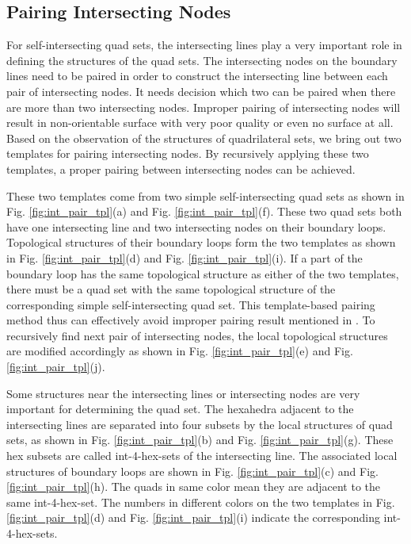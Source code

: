 \documentclass[final,5p,times,twocolumn]{elsarticle}
\begin{document}
\subsection{Pairing Intersecting Nodes}
\label{sec:int_pt_pair}
For self-intersecting quad sets, the intersecting lines play a very important role in defining the structures of the quad sets. The intersecting nodes on the boundary lines need to be paired in order to construct the intersecting line between each pair of intersecting nodes. It needs decision which two can be paired when there are more than two intersecting nodes. Improper pairing of intersecting nodes will result in non-orientable surface with very poor quality or even no surface at all\cite{Suzuki:2010hn}. Based on the observation of the structures of quadrilateral sets, we bring out two templates for pairing intersecting nodes. By recursively applying these two templates, a proper pairing between intersecting nodes can be achieved. 

These two templates come from two simple self-intersecting quad sets as shown in Fig. \ref{fig:int_pair_tpl}(a) and Fig. \ref{fig:int_pair_tpl}(f). These two quad sets both have one intersecting line and two intersecting nodes on their boundary loops. Topological structures of their boundary loops form the two templates as shown in Fig. \ref{fig:int_pair_tpl}(d) and Fig. \ref{fig:int_pair_tpl}(i). If a part of the boundary loop has the same topological structure as either of the two templates, there must be a quad set with the same topological structure of the corresponding simple self-intersecting quad set. This template-based pairing method thus can effectively avoid improper pairing result mentioned in \cite{Suzuki:2010hn}. To recursively find next pair of intersecting nodes, the local topological structures are modified accordingly as shown in Fig. \ref{fig:int_pair_tpl}(e) and Fig. \ref{fig:int_pair_tpl}(j).

Some structures near the intersecting lines or intersecting nodes are very important for determining the quad set. The hexahedra adjacent to the intersecting lines are separated into four subsets by the local structures of quad sets, as shown in Fig. \ref{fig:int_pair_tpl}(b) and Fig. \ref{fig:int_pair_tpl}(g). These hex subsets are called int-4-hex-sets of the intersecting line. The associated local structures of boundary loops are shown in Fig. \ref{fig:int_pair_tpl}(c) and Fig. \ref{fig:int_pair_tpl}(h). The quads in same color mean they are adjacent to the same int-4-hex-set. The numbers in different colors on the two templates in Fig. \ref{fig:int_pair_tpl}(d) and Fig. \ref{fig:int_pair_tpl}(i) indicate the corresponding int-4-hex-sets.
\end{document}
